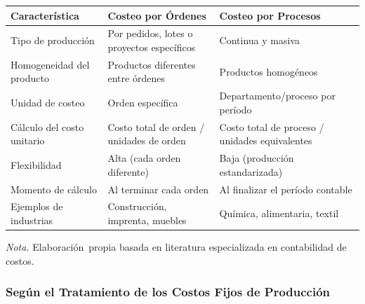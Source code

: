\documentclass[
  stu,
  floatsintext,
  longtable,
  a4paper,
  nolmodern,
  notxfonts,
  notimes,
  12pt,
  colorlinks=true,linkcolor=blue,citecolor=blue,urlcolor=blue]{apa7}
\newcounter{none} %
\begin{document}
\begin{table}

{\caption{{Comparación entre Sistema de Costeo por Órdenes y por
Procesos}{\label{tbl-comparacion-sistemas}}}}

{\def\LTcaptype{none} %
\begin{longtable}[]{@{}
  >{\raggedright\arraybackslash}p{}
  >{\raggedright\arraybackslash}p{}
  >{\raggedright\arraybackslash}p{}@{}}
\toprule\noalign{}
\begin{minipage}[b]{\linewidth}\raggedright
Característica
\end{minipage} & \begin{minipage}[b]{\linewidth}\raggedright
Costeo por Órdenes
\end{minipage} & \begin{minipage}[b]{\linewidth}\raggedright
Costeo por Procesos
\end{minipage} \\
\midrule\noalign{}
\endhead
\bottomrule\noalign{}
\endlastfoot
Tipo de producción & Por pedidos, lotes o proyectos específicos &
Continua y masiva \\
Homogeneidad del producto & Productos diferentes entre órdenes &
Productos homogéneos \\
Unidad de costeo & Orden específica & Departamento/proceso por
período \\
Cálculo del costo unitario & Costo total de orden / unidades de orden &
Costo total de proceso / unidades equivalentes \\
Flexibilidad & Alta (cada orden diferente) & Baja (producción
estandarizada) \\
Momento de cálculo & Al terminar cada orden & Al finalizar el período
contable \\
Ejemplos de industrias & Construcción, imprenta, muebles & Química,
alimentaria, textil \\
\end{longtable}
}

\noindent \emph{Nota.} Elaboración~propia basada en literatura
especializada en contabilidad de costos.

\end{table}

\subsubsection{Según el Tratamiento de los Costos Fijos de
Producción}\label{seguxfan-el-tratamiento-de-los-costos-fijos-de-producciuxf3n}
\end{document}
